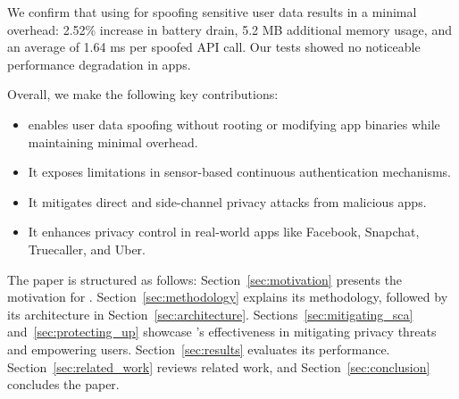 We confirm that using \framework{} for spoofing sensitive user data results in a minimal overhead: 2.52\% increase in battery drain, 5.2 MB additional memory usage, and an average of 1.64 ms per spoofed API call. Our tests showed no noticeable performance degradation in apps.

\noindent Overall, we make the following key contributions:
\begin{itemize}[noitemsep, topsep=0pt]
\item \framework{} enables user data spoofing without rooting or modifying app binaries while maintaining minimal overhead.
\item It exposes limitations in sensor-based continuous authentication mechanisms.
\item It mitigates direct and side-channel privacy attacks from malicious apps.
\item It enhances privacy control in real-world apps like Facebook, Snapchat, Truecaller, and Uber.
\end{itemize}

The paper is structured as follows: Section~\ref{sec:motivation} presents the motivation for \framework{}. Section~\ref{sec:methodology} explains its methodology, followed by its architecture in Section~\ref{sec:architecture}. Sections~\ref{sec:mitigating_sca} and~\ref{sec:protecting_up} showcase \framework{}'s effectiveness in mitigating privacy threats and empowering users. Section~\ref{sec:results} evaluates its performance. Section~\ref{sec:related_work} reviews related work, and Section~\ref{sec:conclusion} concludes the paper.

